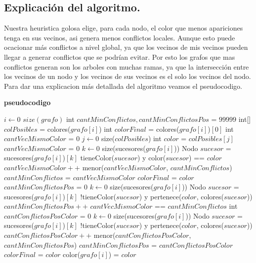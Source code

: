 \subsection{Explicación del algoritmo.}

\vspace*{0.3cm}

Nuestra heuristica golosa elige, para cada nodo, el color que menos apariciones tenga en sus vecinos, asi genera menos conflictos locales. Aunque esto puede ocacionar más conflictos a nivel global, ya que los vecinos de mis vecinos pueden llegar a generar conflictos que se podrían evitar.
Por esto los grafos que mas conflictos generan son los arboles con muchas ramas, ya que la intersección entre los vecinos de un nodo y los vecinos de sus vecinos es el solo los vecinos del nodo.
Para dar una explicacion más detallada del algoritmo veamos el pseudocodigo.

\textbf{pseudocodigo} %

\begin{codebox}
	\li \For $i \gets 0$ \To $size(grafo)$ \Do
	\li		int $cantMinConflictos, cantMinConflictosPos$ = $99999$
	\li 		int[] $colPosibles$ = colores($grafo[i]$)
	\li 		int $colorFinal$ = colores($grafo[i]$)$[0]$
	\li		int $cantVecMismoColor $ = $0$	
	\li		\For $j \gets 0$ \To size($colPosibles$) \Do
	\li	 		int $color$ = $colPosibles[j]$
	\li	 		$cantVecMismoColor$ = $0$
	\li 			\For $k \gets 0$ \To size(sucesores($grafo[i]$)) \Do
	\li 				Nodo $sucesor$ = sucesores($grafo[i]$)$[k]$	
	\li				\If tieneColor($sucesor$) y color($sucesor$) == $color$
	\li					\Then $cantVecMismoColor++$
					\End
				\End
	\li			\If menor($cantVecMismoColor$, $cantMinConflictos$)
	\li				\Then $cantMinConflictos$ = $cantVecMismoColor$
	\li 					$colorFinal$ = $color$
	\li 					$cantMinConflictosPos$ = $0$
	\li 					\For $k \gets 0$ \To size(sucesores($grafo[i]$)) \Do
	\li 						Nodo $sucesor$ = sucesores($grafo[i]$)$[k]$	
	\li						\If !tieneColor($sucesor$) y pertenece($color$, colores($sucesor$))
	\li							\Then $cantMinConflictosPos++$
							\End
						\End
	\li 					\Else 
	\li						\If $cantVecMismoColor$ == $cantMinConflictos$
	\li							\Then int $cantConflictosPosColor$ = $0$
	\li 								\For $k \gets 0$ \To size(sucesores($grafo[i]$)) \Do
	\li 									Nodo $sucesor$ = sucesores($grafo[i]$)$[k]$	
	\li 									\If !tieneColor($sucesor$) y pertenece($color$, colores($sucesor$))
	\li										\Then $cantConflictosPosColor++$
										\End
									\End
	\li								\If menor($cantConflictosPosColor$,$cantMinConflictosPos$)
	\li									\Then $cantMinConflictosPos$ = $cantConflictosPosColor$
	\li 										$colorFinal$ = $color$
									\End
							\End
						\End
				\End
	\li 		color($grafo[i]$) = $color$
			\End
	

\end{codebox}

